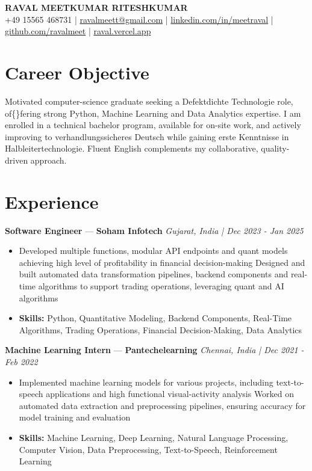 \documentclass[a4paper,10pt]{article}
\begin{document}
\begin{center}
  {\Large\bfseries RAVAL MEETKUMAR RITESHKUMAR}\\[2pt]
  {\small +49 15565 468731 \;|\; \href{mailto:ravalmeett@gmail.com}{ravalmeett@gmail.com} \;|\; \href{https://www.linkedin.com/in/meetraval/}{linkedin.com/in/meetraval} \;|\; \href{https://github.com/ravalmeet}{github.com/ravalmeet} \;|\; \href{https://raval.vercel.app/}{raval.vercel.app}}
\end{center}
\vspace{-3pt}

\section*{Career Objective}
Motivated computer-science graduate seeking a Defektdichte Technologie role, of\{\}fering strong Python, Machine Learning and Data Analytics expertise. I am enrolled in a technical bachelor program, available for on-site work, and actively improving to verhandlungssicheres Deutsch while gaining erste Kenntnisse in Halbleitertechnologie. Fluent English complements my collaborative, quality-driven approach.\par

\section*{Experience}
\textbf{Software Engineer} — \textbf{Soham Infotech} \hfill \textit{Gujarat, India \;|\; Dec 2023 - Jan 2025}\par
\vspace{1pt}
\begin{itemize}
  \item Developed multiple functions, modular API endpoints and quant models achieving high level of profitability in financial decision-making Designed and built automated data transformation pipelines, backend components and real-time algorithms to support trading operations, leveraging quant and AI algorithms
  \item \textbf{Skills:} Python, Quantitative Modeling, Backend Components, Real-Time Algorithms, Trading Operations, Financial Decision-Making, Data Analytics
\end{itemize}
\vspace{3pt}
\textbf{Machine Learning Intern} — \textbf{Pantechelearning} \hfill \textit{Chennai, India \;|\; Dec 2021 - Feb 2022}\par
\vspace{1pt}
\begin{itemize}
  \item Implemented machine learning models for various projects, including text-to-speech applications and high functional visual-activity analysis Worked on automated data extraction and preprocessing pipelines, ensuring accuracy for model training and evaluation
  \item \textbf{Skills:} Machine Learning, Deep Learning, Natural Language Processing, Computer Vision, Data Preprocessing, Text-to-Speech, Reinforcement Learning
\end{itemize}
\end{document}
